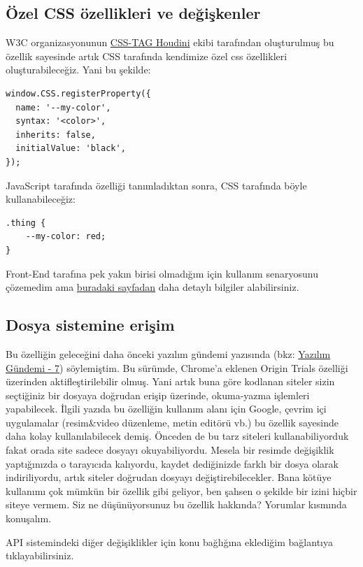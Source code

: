 \documentclass[11pt]{article}
\begin{document}
\subsection{Özel CSS özellikleri ve değişkenler}
\label{sec:orgce9c8da}
W3C organizasyonunun \href{https://drafts.css-houdini.org/}{CSS-TAG Houdini} ekibi tarafından oluşturulmuş bu
özellik sayesinde artık CSS tarafında kendimize özel css özellikleri
oluşturabileceğiz. Yani bu şekilde:
\begin{verbatim}
window.CSS.registerProperty({
  name: '--my-color',
  syntax: '<color>',
  inherits: false,
  initialValue: 'black',
});
\end{verbatim}
JavaScript tarafında özelliği tanımladıktan sonra, CSS tarafında böyle
kullanabileceğiz:
\begin{verbatim}
.thing {
    --my-color: red;
}
\end{verbatim}
Front-End tarafına pek yakın birisi olmadığım için kullanım senaryosunu
çözemedim ama \href{https://web.dev/css-props-and-vals/}{buradaki sayfadan} daha detaylı bilgiler alabilirsiniz.
\subsection{Dosya sistemine erişim}
\label{sec:orgf612b12}
Bu özelliğin geleceğini daha önceki yazılım gündemi yazısında (bkz: \href{../07/yazilim-gundemi-07.pdf}{Yazılım
Gündemi - 7}) söylemiştim. Bu sürümde, Chrome'a eklenen Origin Trials
özelliği üzerinden aktifleştirilebilir olmuş. Yani artık buna göre kodlanan
siteler sizin seçtiğiniz bir dosyaya doğrudan erişip üzerinde, okuma-yazma
işlemleri yapabilecek. İlgili yazıda bu özelliğin kullanım alanı için
Google, çevrim içi uygulamalar (resim\&video düzenleme, metin editörü vb.) bu
özellik sayesinde daha kolay kullanılabilecek demiş. Önceden de bu tarz
siteleri kullanabiliyorduk fakat orada site sadece dosyayı okuyabiliyordu.
Mesela bir resimde değişiklik yaptığınızda o tarayıcıda kalıyordu, kaydet
dediğinizde farklı bir dosya olarak indiriliyordu, artık siteler doğrudan
dosyayı değiştirebilecekler. Bana kötüye kullanımı çok mümkün bir özellik
gibi geliyor, ben şahsen o şekilde bir izini hiçbir siteye vermem. Siz ne
düşünüyorsunuz bu özellik hakkında? Yorumlar kısmında konuşalım.

API sistemindeki diğer değişiklikler için konu bağlığına eklediğim bağlantıya
tıklayabilirsiniz.
\end{document}
